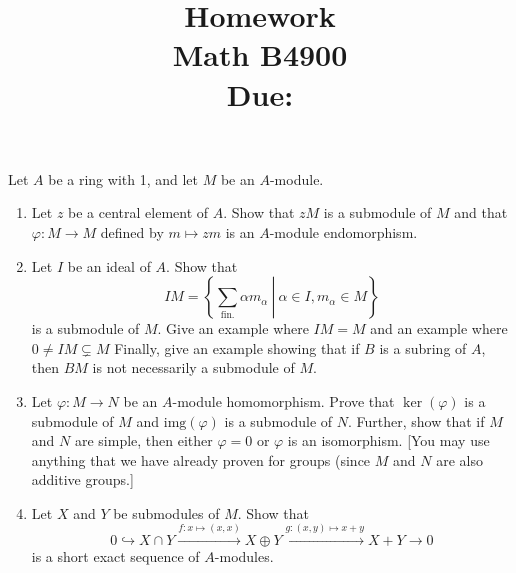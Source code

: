 \documentclass[11pt, reqno]{amsart}
\title[Homework \HW]{Homework \HW \\
Math B4900\\
\small Due: \DUE}
\author{}
\theoremstyle{plain}
\theoremstyle{definition}
\theoremstyle{example}
\def\img{\mathrm{img}}
\def\f{\varphi}
\def\HW{4}
\def\DUE{3/14/2021}
\begin{document}
\maketitle %


Let $A$ be a ring with 1, and let $M$ be an $A$-module.
\begin{enumerate}[1.]
\item Let $z$ be a central element of $A$. Show that $zM$ is a submodule of $M$ and that $\f: M \to M$ defined by $m \mapsto zm$ is an $A$-module endomorphism.

\item Let $I$ be an ideal of $A$. Show that 
$$IM = \left\{ \left. \sum_{\text{fin.}} \alpha m_\alpha ~\right|~ \alpha \in I, m_\alpha \in M\right\}$$
is a submodule of $M$. Give an example where $IM = M$ and an example where $0 \ne IM \subsetneq M$ Finally, give an example showing that if $B$ is a subring of $A$, then $BM$ is not necessarily a submodule of $M$.

\item Let $\f: M \to N$ be an $A$-module homomorphism. Prove that $\ker(\f)$ is a submodule of $M$ and $\img(\f)$ is a submodule of $N$. Further, show that if $M$ and $N$ are simple, then either $\f = 0$ or  $\f$ is an isomorphism. {[You may use anything that we have already proven for groups (since $M$ and $N$ are also additive groups.]}

\item Let $X$ and $Y$ be submodules of $M$. Show that
$$0 \hookrightarrow X \cap Y \xrightarrow{f: x \mapsto (x,x)} 
	X \oplus Y \xrightarrow{g: (x,y) \mapsto x + y} X + Y \to 0$$
is a short exact sequence of $A$-modules. 


\end{enumerate}
\end{document}
